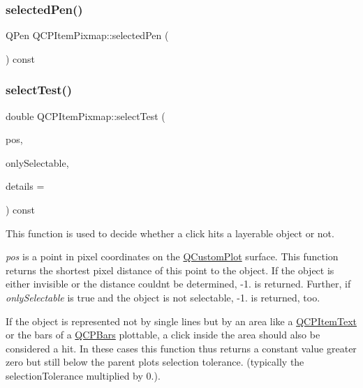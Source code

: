 \subsubsection{\texorpdfstring{selected\+Pen()}{selectedPen()}}
{\footnotesize\ttfamily Q\+Pen Q\+C\+P\+Item\+Pixmap\+::selected\+Pen (\begin{DoxyParamCaption}{ }\end{DoxyParamCaption}) const\hspace{0.3cm}{\ttfamily [inline]}}

\mbox{\label{class_q_c_p_item_pixmap_a65d1ede7bb479b90d40186d083071947}} 
\subsubsection{\texorpdfstring{select\+Test()}{selectTest()}}
{\footnotesize\ttfamily double Q\+C\+P\+Item\+Pixmap\+::select\+Test (\begin{DoxyParamCaption}\item[{const Q\+PointF \&}]{pos,  }\item[{bool}]{only\+Selectable,  }\item[{Q\+Variant $\ast$}]{details = {} }\end{DoxyParamCaption}) const\hspace{0.3cm}{\ttfamily [virtual]}}

This function is used to decide whether a click hits a layerable object or not.

{\itshape pos} is a point in pixel coordinates on the \hyperlink{class_q_custom_plot}{Q\+Custom\+Plot} surface. This function returns the shortest pixel distance of this point to the object. If the object is either invisible or the distance couldn\textquotesingle{}t be determined, -\/1. is returned. Further, if {\itshape only\+Selectable} is true and the object is not selectable, -\/1. is returned, too.

If the object is represented not by single lines but by an area like a \hyperlink{class_q_c_p_item_text}{Q\+C\+P\+Item\+Text} or the bars of a \hyperlink{class_q_c_p_bars}{Q\+C\+P\+Bars} plottable, a click inside the area should also be considered a hit. In these cases this function thus returns a constant value greater zero but still below the parent plot\textquotesingle{}s selection tolerance. (typically the selection\+Tolerance multiplied by 0.).

